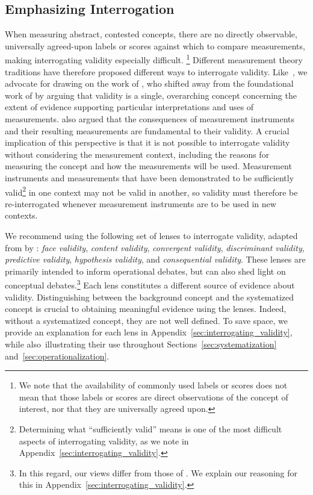 \documentclass{article}
\begin{document}
\subsection{Emphasizing Interrogation}
\label{sec:emphasizing_intrrogation}

When measuring abstract, contested concepts, there are no directly observable, universally agreed-upon labels or scores against which to compare measurements, making interrogating validity especially difficult. 
\footnote{We note that the availability of commonly used labels or scores does not mean that 
those labels or scores 
are direct observations of the concept of interest, nor that they are universally agreed upon.} Different measurement theory traditions have therefore proposed different ways to interrogate validity. Like~\citet{adcock2001measurement}, we advocate for drawing on the work of \citet{messick1987validity}, who shifted away from the foundational work of \citet{cronbach1955construct} by arguing that validity is a single, overarching concept concerning the extent of evidence supporting particular interpretations and uses of measurements. \citeauthor{messick1987validity} also argued that the consequences of measurement instruments and their
 resulting measurements are fundamental to their validity. A crucial implication of this perspective is that it is not possible to interrogate validity without considering the measurement context, including the reasons for measuring the concept and how the measurements will be used. Measurement instruments and measurements that have been demonstrated to be sufficiently valid\footnote{Determining what ``sufficiently valid'' means is one of the most difficult aspects of interrogating validity, as we note in Appendix~\ref{sec:interrogating_validity}.} in one context may not be valid in another, so validity must therefore be re-interrogated whenever measurement instruments are to be used in new contexts.

We recommend using the following set of lenses to interrogate validity, adapted from \citet{messick1987validity} by \citet{jacobs2021measurement}: \emph{face validity}, \emph{content validity}, \emph{convergent validity}, \emph{discriminant validity}, \emph{predictive validity}, \emph{hypothesis validity}, and \emph{consequential validity}. 
These lenses are primarily intended to inform operational debates, but can also shed light on conceptual debates.\footnote{In this regard, our views differ from those of \citet{adcock2001measurement}. We explain our reasoning for this in Appendix~\ref{sec:interrogating_validity}.} Each lens constitutes
a different source of evidence about validity. Distinguishing between the background concept and the systematized concept is crucial to obtaining meaningful evidence using the lenses. Indeed, without a systematized concept, they are not well defined. To save space, we provide an explanation for each lens in Appendix~\ref{sec:interrogating_validity}, while also~illustrating their use throughout Sections~\ref{sec:systematization} and~\ref{sec:operationalization}.
\end{document}
